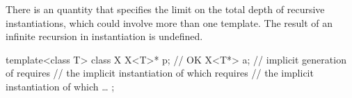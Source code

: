 \pnum
There is an  quantity
that specifies the limit on the total depth of recursive instantiations,
which could involve more than one template.
The result of an infinite recursion in instantiation is undefined.
\begin{example}
\begin{codeblock}
template<class T> class X {
  X<T>* p;          // OK
  X<T*> a;          // implicit generation of  requires
                    // the implicit instantiation of  which requires
                    // the implicit instantiation of  which \ldots
};
\end{codeblock}
\end{example}

